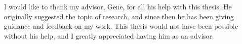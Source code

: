 
I would like to thank my advisor, Gene, for all his help with this thesis. He originally suggested the topic of research, and since then he has been giving guidance and feedback on my work. This thesis would not have been possible without his help, and I greatly appreciated having him as an advisor.





